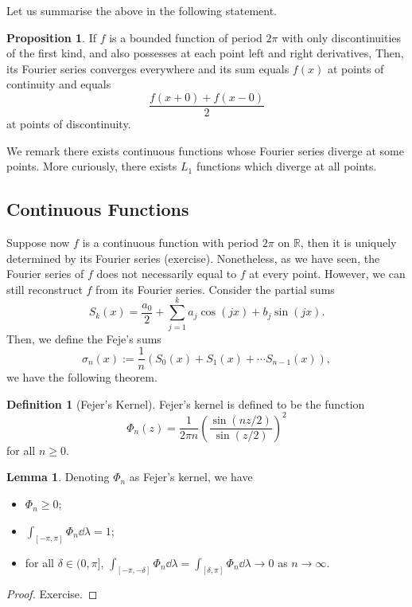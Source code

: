 \documentclass[]{article}
\theoremstyle{definition}
\theoremstyle{definition}
\newtheorem{definition}{Definition}[section]
\newtheorem{lemma}{Lemma}[section]
\newtheorem{proposition}{Proposition}[section]
\begin{document}
Let us summarise the above in the following statement.

\begin{proposition}
  If \(f\) is a bounded function of period \(2\pi\) with only 
  discontinuities of the first kind, and also possesses at each point left and right 
  derivatives, Then, its Fourier series converges everywhere and its sum equals 
  \(f(x)\) at points of continuity and equals 
  \[\frac{f(x + 0) + f(x - 0)}{2}\]
  at points of discontinuity.
\end{proposition}

We remark there exists continuous functions whose Fourier series diverge at some 
points. More curiously, there exists \(L_1\) functions which diverge at all points.

\subsection{Continuous Functions}

Suppose now \(f\) is a continuous function with period \(2\pi\) on \(\mathbb{R}\), 
then it is uniquely determined by its Fourier series (exercise). Nonetheless, as 
we have seen, the Fourier series of \(f\) does not necessarily equal to \(f\) 
at every point. However, we can still reconstruct \(f\) from its Fourier series. 
Consider the partial sums 
\[S_k(x) = \frac{a_0}{2} + \sum_{j = 1}^k a_j \cos (jx) + b_j \sin (jx).\]
Then, we define the Feje's sums 
\[\sigma_n(x) := \frac{1}{n}(S_0(x) + S_1(x) + \cdots S_{n - 1}(x)),\]
we have the following theorem.

\begin{definition}[Fejer's Kernel]
  Fejer's kernel is defined to be the function 
  \[\Phi_n(z) = \frac{1}{2\pi n}\left(\frac{\sin(nz / 2)}{\sin(z / 2)}\right)^2\]
  for all \(n \ge 0\).
\end{definition}

\begin{lemma}
  Denoting \(\Phi_n\) as Fejer's kernel, we have 
  \begin{itemize}
    \item \(\Phi_n \ge 0\);
    \item \(\int_{[-\pi, \pi]} \Phi_n \dd \lambda = 1\);
    \item for all \(\delta \in (0, \pi]\), 
      \(\int_{[-\pi, -\delta]} \Phi_n \dd \lambda = \int_{[\delta, \pi]} \Phi_n \dd \lambda \to 0\) as 
      \(n \to \infty\).
  \end{itemize}
\end{lemma}
\begin{proof}
  Exercise.
\end{proof}
\end{document}
